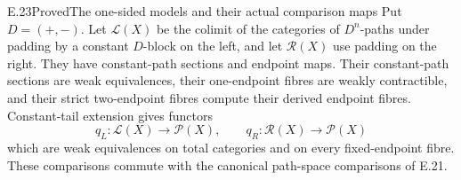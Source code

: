 \begin{claim}{E.23}{Proved}{The one-sided models and their actual comparison maps}
Put $D=(+,-)$. Let $\mathcal L(X)$ be the colimit of the categories of $D^n$-paths under padding by a constant $D$-block on the left, and let $\mathcal R(X)$ use padding on the right. They have constant-path sections and endpoint maps. Their constant-path sections are weak equivalences, their one-endpoint fibres are weakly contractible, and their strict two-endpoint fibres compute their derived endpoint fibres. Constant-tail extension gives functors
\[
 q_L:\mathcal L(X)\longrightarrow\mathcal P(X),
 \qquad q_R:\mathcal R(X)\longrightarrow\mathcal P(X)
\]
which are weak equivalences on total categories and on every fixed-endpoint fibre. These comparisons commute with the canonical path-space comparisons of E.21.
\end{claim}
